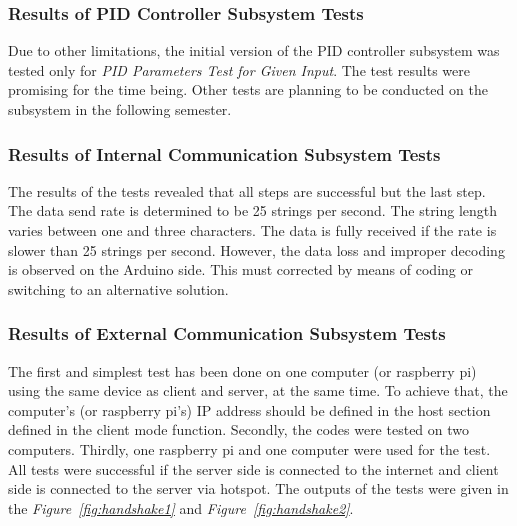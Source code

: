 \documentclass[a4paper,12pt]{article}
\begin{document}
		
	\subsubsection*{Results of PID Controller Subsystem Tests}
	
		Due to other limitations, the initial version of the PID controller subsystem was tested only for \textit{PID Parameters Test for Given Input}. The test results were promising for the time being. Other tests are planning to be conducted on the subsystem in the following semester.
	
	
	
	
	
	
	
	\subsubsection*{Results of Internal Communication Subsystem Tests}
	The results of the tests revealed that all steps are successful but the last step. The data send rate is determined to be 25 strings per second. The string length varies between one and three characters. The data is fully received if the rate is slower than 25 strings per second. However, the data loss  and  improper decoding is observed on the Arduino side. This must corrected by means of coding or switching to an alternative solution.
	

	
	
	
		

	\subsubsection*{Results of External Communication Subsystem Tests}
	
	 The first and simplest test has been done on one computer (or raspberry pi) using the same device as client and server, at the same time. To achieve that, the computer's (or raspberry pi’s) IP address should be defined in the host section defined in the client mode function. Secondly, the codes were tested on two computers. Thirdly, one raspberry pi and one computer were used for the test. All tests were successful if the server side is connected to the internet and client side is connected to the server via hotspot. The outputs of the tests were given in the \textit{Figure~\ref{fig:handshake1}} and \textit{Figure~\ref{fig:handshake2}}.
	
	
	
	
	
\end{document}
